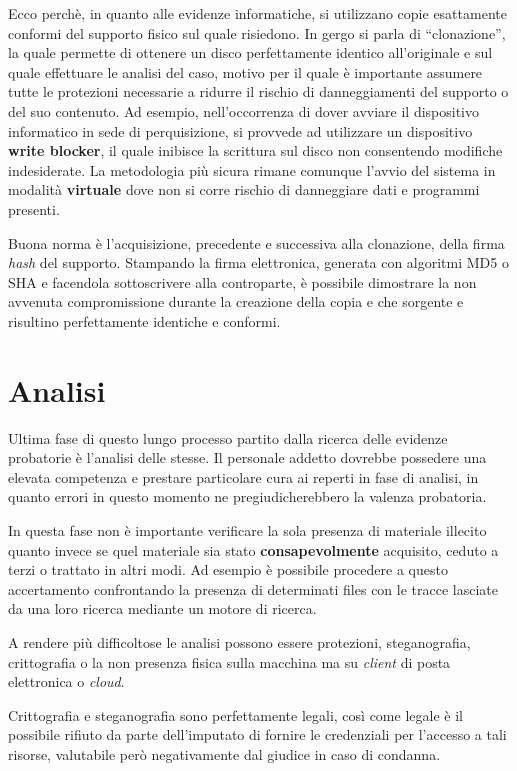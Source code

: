 Ecco perchè, in quanto alle evidenze informatiche, si utilizzano copie esattamente conformi del supporto fisico sul quale risiedono. In gergo si parla di ``clonazione'', la quale permette di ottenere un disco perfettamente identico all'originale e sul quale effettuare le analisi del caso, motivo per il quale è importante assumere tutte le protezioni necessarie a ridurre il rischio di danneggiamenti del supporto o del suo contenuto. Ad esempio, nell'occorrenza di dover avviare il dispositivo informatico in sede di perquisizione, si provvede ad utilizzare un dispositivo \textbf{write blocker}, il quale inibisce la scrittura sul disco non consentendo modifiche indesiderate. La metodologia più sicura rimane comunque l'avvio del sistema in modalità \textbf{virtuale} dove non si corre rischio di danneggiare dati e programmi presenti.

Buona norma è l'acquisizione, precedente e successiva alla clonazione, della firma \textit{hash} del supporto. Stampando la firma elettronica, generata con algoritmi MD5 o SHA e facendola sottoscrivere alla controparte, è possibile dimostrare la non avvenuta compromissione durante la creazione della copia e che sorgente e  risultino perfettamente identiche e conformi.

\section{Analisi}

Ultima fase di questo lungo processo partito dalla ricerca delle evidenze probatorie è l'analisi delle stesse.
Il personale addetto dovrebbe possedere una elevata competenza e prestare particolare cura ai reperti in fase di analisi, in quanto errori in questo momento ne pregiudicherebbero la valenza probatoria.

In questa fase non è importante verificare la sola presenza di materiale illecito quanto invece se quel materiale sia stato \textbf{consapevolmente} acquisito, ceduto a terzi o trattato in altri modi. Ad esempio è possibile procedere a questo accertamento confrontando la presenza di determinati files con le tracce lasciate da una loro ricerca mediante un motore di ricerca.

A rendere più difficoltose le analisi possono essere protezioni, steganografia, crittografia o la non presenza fisica sulla macchina ma su \textit{client} di posta elettronica o \textit{cloud}.

Crittografia e steganografia sono perfettamente legali, così come legale è il possibile rifiuto da parte dell'imputato di fornire le credenziali per l'accesso a tali risorse, valutabile però negativamente dal giudice in caso di condanna.

